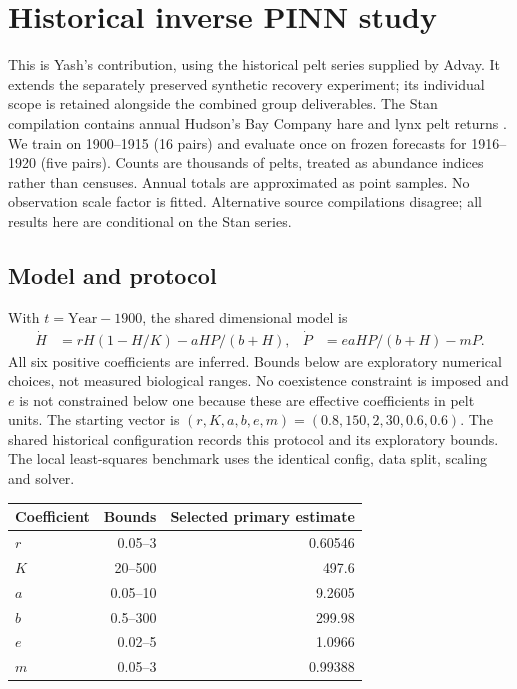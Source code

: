\section{Historical inverse PINN study}
This is Yash's contribution, using the historical pelt series supplied by Advay. It
extends the separately preserved synthetic recovery experiment; its individual scope is retained alongside the combined group deliverables. The Stan compilation contains annual Hudson's Bay Company
hare and lynx pelt returns \cite{carpenter2018}. We train on 1900--1915 (16 pairs) and
evaluate once on frozen forecasts for 1916--1920 (five pairs). Counts are thousands of
pelts, treated as abundance indices rather than censuses. Annual totals are approximated
as point samples. No observation scale factor is fitted. Alternative source compilations
disagree; all results here are conditional on the Stan series.

\subsection{Model and protocol}
With $t=\mathrm{Year}-1900$, the shared dimensional model is
\begin{align*}
\dot H&=rH(1-H/K)-aHP/(b+H), & \dot P&=eaHP/(b+H)-mP.
\end{align*}
All six positive coefficients are inferred. Bounds below are exploratory numerical
choices, not measured biological ranges. No coexistence constraint is imposed and $e$
is not constrained below one because these are effective coefficients in pelt units.
The starting vector is $(r,K,a,b,e,m)=(0.8,150,2,30,0.6,0.6)$. The shared historical configuration records this protocol and its exploratory bounds. The local least-squares
benchmark uses the identical config, data split, scaling and solver.
\begin{center}\begin{tabular}{lrr}\toprule
Coefficient & Bounds & Selected primary estimate\\\midrule
$r$ & 0.05--3 & 0.60546 \\
$K$ & 20--500 & 497.6 \\
$a$ & 0.05--10 & 9.2605 \\
$b$ & 0.5--300 & 299.98 \\
$e$ & 0.02--5 & 1.0966 \\
$m$ & 0.05--3 & 0.99388 \\
\bottomrule\end{tabular}\end{center}

